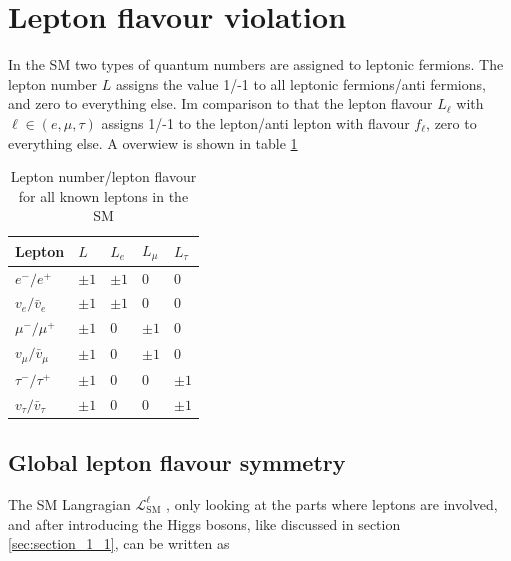 \section{Lepton flavour violation}
\label{sec:section_1_3}

In the \gls{SM} two types of quantum numbers are assigned to leptonic fermions. The lepton number $L$ assigns the value 1/-1 to all leptonic fermions/anti fermions, and zero to everything else. Im comparison to that the lepton flavour $L_{\ell}$ with $\ell \in (e, \mu, \tau)$ assigns 1/-1 to the lepton/anti lepton with flavour $f_{\ell}$, zero to everything else. A overwiew is shown in table \ref{tab:tab_1_2}


\begin{table}[h]
	\centering
	\caption[Lepton number/lepton flavour of leptons]{Lepton number/lepton flavour for all known leptons in the \gls{SM}}
	\label{tab:tab_1_2}

	\begin{tabular}{l|l|l|l|l}
		Lepton				&$L$		&$L_{e}$	&$L_{\mu}$	&$L_{\tau}$	\\ \hline
		
		$e^{-}/e^{+}$			&$\pm 1$	&$\pm 1$	&0		&0		\\

		$v_{e}/\bar{v}_{e}$		&$\pm 1$	&$\pm 1$	&0		&0		\\
		
		$\mu^{-}/\mu^{+}$		&$\pm 1$	&0		&$\pm 1$	&0		\\

		$v_{\mu}/\bar{v}_{\mu}$		&$\pm 1$	&0		&$\pm 1$	&0		\\
		
		$\tau^{-}/\tau^{+}$		&$\pm 1$	&0		&0		&$\pm 1$	\\

		$v_{\tau}/\bar{v}_{\tau}$	&$\pm 1$	&0		&0		&$\pm 1$	\\			
	\end{tabular}
\end{table}


\subsection{Global lepton flavour symmetry}
\label{sec:section_1_3_1}

The \gls{SM} Langragian $\mathcal{L}^{\ell}_{\text{SM}}$ \cite{Peskin, EWK}, only looking at the parts where leptons are involved, and after introducing the Higgs bosons, like discussed in section \ref{sec:section_1_1}, can be written as

